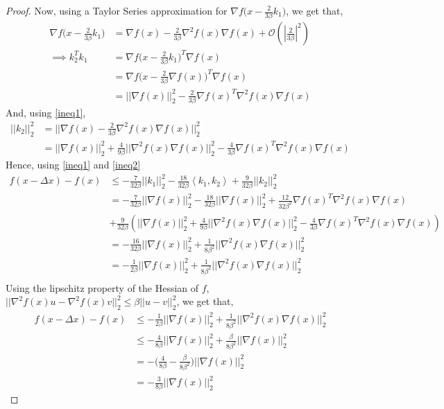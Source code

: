 \documentclass[12pt,twoside]{article}
\begin{document}
\begin{proof}
Now, using a Taylor Series approximation for $\nabla f \big( x - \frac{2}{3\beta}k_1 \big)$, we get that,
\begin{equation}
\begin{aligned}\label{ineq1}
\nabla f \big( x - \frac{2}{3\beta}k_1 \big) &= \nabla f(x) - \frac{2}{3\beta} \nabla^2 f(x) \nabla f(x) + \mathcal{O}( |\frac{2}{3\beta} |^2 ) \\
\implies  k_2^Tk_1 &= \nabla f \big( x - \frac{2}{3\beta}k_1 \big)^T\nabla f(x) \\
 &= \nabla f \big( x - \frac{2}{3\beta}\nabla f(x) \big)^T \nabla f(x) \\
&= || \nabla f(x) ||_2^2 - \frac{2}{3 \beta} \nabla f(x)^T \nabla^2 f(x) \nabla f(x)
\end{aligned}
\end{equation}
And, using \eqref{ineq1},
\begin{equation}
\begin{aligned} \label{ineq2}
|| k_2 ||_2^2 &= ||  \nabla f(x) - \frac{2}{3\beta} \nabla^2 f(x) \nabla f(x)  ||_2^2   \\
&= || \nabla f(x)||_2^2 + \frac{4}{9\beta}||\nabla^2 f(x) \nabla f(x)  ||_2^2 - \frac{4}{3\beta} \nabla f(x)^T \nabla^2 f(x) \nabla f(x)
\end{aligned}
\end{equation}
Hence, using \eqref{ineq1} and \eqref{ineq2}
\begin{align*}
f(x - \Delta x) - f(x) & \leq  -\frac{7}{32 \beta}|| k_1 ||_2^2 - \frac{18}{32 \beta} \left\langle k_1, k_2 \right\rangle + \frac{9}{32 \beta}|| k_2 ||_2^2 \\
&= -\frac{7}{32 \beta}|| \nabla f(x) ||_2^2 -  \frac{18}{32 \beta} || \nabla f(x) ||_2^2 + \frac{12}{32 \beta^2} \nabla f(x)^T \nabla^2 f(x) \nabla f(x) \\
&+  \frac{9}{32\beta}( || \nabla f(x)||_2^2 + \frac{4}{9\beta}||\nabla^2 f(x) \nabla f(x)  ||_2^2 - \frac{4}{3\beta} \nabla f(x)^T \nabla^2 f(x) \nabla f(x) )  \\
&= -\frac{16}{32 \beta}|| \nabla f(x)||_2^2 + \frac{1}{8 \beta^2}||\nabla^2 f(x) \nabla f(x)  ||_2^2 \\
&= -\frac{1}{2\beta} || \nabla f(x)||_2^2 + \frac{1}{8 \beta^2}||\nabla^2 f(x) \nabla f(x)  ||_2^2 \\
\end{align*}
Using the lipschitz property of the Hessian of $f$, $||\nabla^2 f(x) u - \nabla^2 f(x) v||_2^2 \leq \beta || u-v ||_2^2 $, we get that,
\begin{equation}
\begin{aligned}
f(x - \Delta x) - f(x) & \leq -\frac{1}{2\beta} || \nabla f(x)||_2^2 + \frac{1}{8 \beta^2}||\nabla^2 f(x) \nabla f(x)  ||_2^2 \\
& \leq -\frac{4}{8\beta}|| \nabla f(x) ||_2^2 + \frac{\beta}{8 \beta^2}|| \nabla f(x) ||_2^2 \\
& = -\big( \frac{4}{8\beta} - \frac{\beta}{8\beta^2}   \big)  || \nabla f(x) ||_2^2  \\
&= -\frac{3}{8\beta} || \nabla f(x) ||_2^2
\end{aligned}
\end{equation}
\end{proof}
\end{document}
